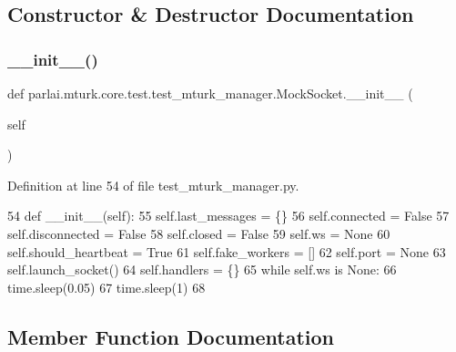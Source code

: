 \subsection{Constructor \& Destructor Documentation}
\mbox{\label{classparlai_1_1mturk_1_1core_1_1test_1_1test__mturk__manager_1_1MockSocket_a9c0f4f7ec371dcf43c515fecdcc5c282}} 
\subsubsection{\texorpdfstring{\+\_\+\+\_\+init\+\_\+\+\_\+()}{\_\_init\_\_()}}
{\footnotesize\ttfamily def parlai.\+mturk.\+core.\+test.\+test\+\_\+mturk\+\_\+manager.\+Mock\+Socket.\+\_\+\+\_\+init\+\_\+\+\_\+ (\begin{DoxyParamCaption}\item[{}]{self }\end{DoxyParamCaption})}



Definition at line 54 of file test\+\_\+mturk\+\_\+manager.\+py.


\begin{DoxyCode}
54     \textcolor{keyword}{def }\_\_init\_\_(self):
55         self.last\_messages = \{\}
56         self.connected = \textcolor{keyword}{False}
57         self.disconnected = \textcolor{keyword}{False}
58         self.closed = \textcolor{keyword}{False}
59         self.ws = \textcolor{keywordtype}{None}
60         self.should\_heartbeat = \textcolor{keyword}{True}
61         self.fake\_workers = []
62         self.port = \textcolor{keywordtype}{None}
63         self.launch\_socket()
64         self.handlers = \{\}
65         \textcolor{keywordflow}{while} self.ws \textcolor{keywordflow}{is} \textcolor{keywordtype}{None}:
66             time.sleep(0.05)
67         time.sleep(1)
68 
\end{DoxyCode}


\subsection{Member Function Documentation}
\mbox{\label{classparlai_1_1mturk_1_1core_1_1test_1_1test__mturk__manager_1_1MockSocket_aa77f36c7f5a11e544ab32904c6fdc9af}} 
